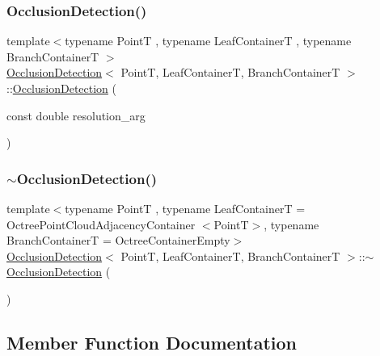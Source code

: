 \subsubsection{\texorpdfstring{Occlusion\+Detection()}{OcclusionDetection()}}
{\footnotesize\ttfamily template$<$typename PointT , typename Leaf\+ContainerT , typename Branch\+ContainerT $>$ \\
\hyperlink{classOcclusionDetection}{Occlusion\+Detection}$<$ PointT, Leaf\+ContainerT, Branch\+ContainerT $>$\+::\hyperlink{classOcclusionDetection}{Occlusion\+Detection} (\begin{DoxyParamCaption}\item[{const double}]{resolution\+\_\+arg }\end{DoxyParamCaption})}

\mbox{\label{classOcclusionDetection_ae4b87aa0e0cd1806dab5ceebf8eb1992}} 
\subsubsection{\texorpdfstring{$\sim$\+Occlusion\+Detection()}{~OcclusionDetection()}}
{\footnotesize\ttfamily template$<$typename PointT , typename Leaf\+ContainerT  = Octree\+Point\+Cloud\+Adjacency\+Container $<$\+Point\+T$>$, typename Branch\+ContainerT  = Octree\+Container\+Empty$>$ \\
\hyperlink{classOcclusionDetection}{Occlusion\+Detection}$<$ PointT, Leaf\+ContainerT, Branch\+ContainerT $>$\+::$\sim$\hyperlink{classOcclusionDetection}{Occlusion\+Detection} (\begin{DoxyParamCaption}{ }\end{DoxyParamCaption})\hspace{0.3cm}{\ttfamily [inline]}}



\subsection{Member Function Documentation}
\mbox{\label{classOcclusionDetection_a7085e4d2d0e2d952f90fa366c73a12bc}} 

